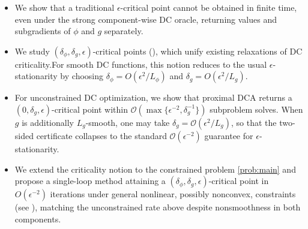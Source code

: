 \begin{itemize}
\item We show that a traditional $\epsilon$-critical point cannot be
obtained in finite time, even under the strong component-wise DC
oracle, returning values and subgradients of $\phi$ and $g$
separately.


\item We study $(\delta_\phi,\delta_g,\epsilon)$-critical points
(), which unify existing relaxations of
DC criticality.For smooth DC functions, this notion reduces to the usual
$\epsilon$-stationarity by choosing \(\delta_\phi=O(\epsilon^2/L_\phi)\) and \(\delta_g=O(\epsilon^2/L_g)\).

\item For unconstrained DC optimization, we show that proximal DCA returns a \((0,\delta_g,\epsilon)\)-critical point within
\(\mathcal O(\max\limits\{\epsilon^{-2},\delta_g^{-1}\})\) subproblem solves.
When \(g\) is additionally \(L_g\)-smooth, one may take
\(\delta_g=\mathcal O(\epsilon^2/L_g)\), so that the two-sided certificate
collapses to the standard \(\mathcal O(\epsilon^{-2})\) guarantee for
\(\epsilon\)-stationarity. 

\item We extend the criticality notion to the constrained problem
\eqref{prob:main} and propose a single-loop method attaining a
$(\delta_\phi,\delta_g,\epsilon)$-critical point in $O(\epsilon^{-2})$
iterations under general nonlinear, possibly nonconvex, constraints
(see ), matching the unconstrained rate above
despite nonsmoothness in both components.
\end{itemize}


